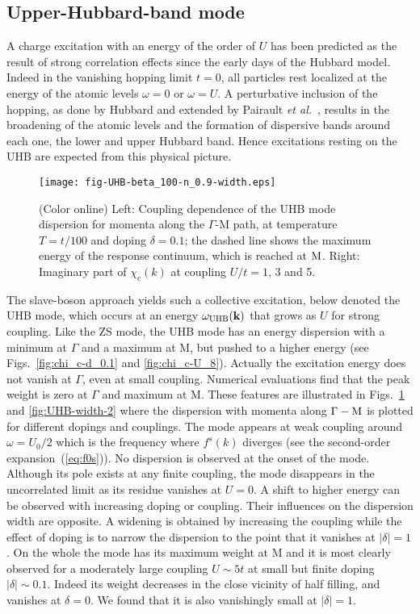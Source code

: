 \documentclass[showpacs,amsmath,twocolumn,floatfix]{revtex4-1}
\begin{document}
\subsection{Upper-Hubbard-band mode}


A charge excitation with an energy of the order of $U$ has been predicted as 
the result of strong correlation effects since the early days of the Hubbard 
model. Indeed in the vanishing hopping limit $t=0$, all particles rest 
localized at the energy of the atomic levels $\omega=0$ or $\omega=U$. 
A perturbative inclusion of the hopping, as done by Hubbard and extended by Pairault
\textit{et al.}~\cite{Pai00}, results in the broadening of the atomic levels and the 
formation of dispersive bands around each one, the lower and upper Hubbard band. 
Hence excitations resting on the UHB are expected from this physical picture.


\begin{figure}[b]
  \texttt{[image: fig-UHB-beta\_100-n\_0.9-width.eps]}
  \caption{(Color online) Left: Coupling dependence of the UHB mode dispersion for 
  momenta along the $\Gamma$-M path, at temperature $T=t/100$ and doping $\delta=0.1$; 
  the dashed line shows the maximum energy of the response continuum, which is reached 
  at ${\rm M}$. Right: Imaginary part of $\chi_c(k)$ at coupling $U/t=1$, 3 and 5.}
  \label{fig:UHB-width-1}
\end{figure}

The slave-boson approach yields such a collective excitation, below denoted 
the UHB mode, which occurs at an energy $\omega_{\rm UHB}({\bf k})$ that
grows as $U$ for strong coupling. 
Like the ZS mode, the UHB mode has an
energy dispersion with a minimum at $\Gamma$ and a maximum at M, but pushed 
to a higher energy (see Figs.~\ref{fig:chi_c-d_0.1} and \ref{fig:chi_c-U_8}). 
Actually the excitation energy does not vanish at $\Gamma$, even at small 
coupling. Numerical evaluations find that the peak weight is zero at $\Gamma$ 
and maximum at M. These features are illustrated in Figs.~\ref{fig:UHB-width-1} 
and \ref{fig:UHB-width-2} where the dispersion with momenta along 
$\Gamma-{\rm M}$ is plotted for different dopings and couplings. The mode 
appears at weak coupling around $\omega=U_0/2$ which is the frequency where 
$f^s(k)$ diverges (see the second-order expansion~(\ref{eq:f0s})). No 
dispersion is observed at the onset of the mode. Although its pole exists at 
any finite coupling, the mode disappears in the uncorrelated limit as its 
residue vanishes at $U=0$. A shift to higher energy can be observed with 
increasing doping or coupling. Their influences on the dispersion width 
are opposite. A widening is obtained by increasing the coupling while the 
effect of doping is to narrow the dispersion to the point that it vanishes 
at $|\delta| = 1$. On the whole the mode has its maximum weight at M and it is 
most clearly observed for a moderately large coupling $U \sim 5t$ at small but 
finite doping $|\delta| \sim 0.1$. Indeed its weight decreases in the close 
vicinity of half filling, and vanishes at $\delta=0$. We found that it 
is also vanishingly small at $|\delta|=1$.
\end{document}
